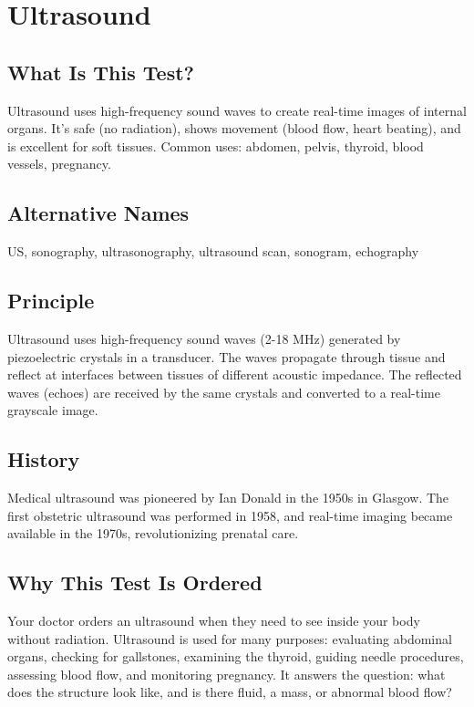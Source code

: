 \chapter{Ultrasound}

\section*{What Is This Test?}
Ultrasound uses high-frequency sound waves to create real-time images of internal organs. It's safe (no radiation), shows movement (blood flow, heart beating), and is excellent for soft tissues. Common uses: abdomen, pelvis, thyroid, blood vessels, pregnancy.

\section*{Alternative Names}
US, sonography, ultrasonography, ultrasound scan, sonogram, echography


\section*{Principle}
Ultrasound uses high-frequency sound waves (2-18 MHz) generated by piezoelectric crystals in a transducer. The waves propagate through tissue and reflect at interfaces between tissues of different acoustic impedance. The reflected waves (echoes) are received by the same crystals and converted to a real-time grayscale image.

\section*{History}
Medical ultrasound was pioneered by Ian Donald in the 1950s in Glasgow. The first obstetric ultrasound was performed in 1958, and real-time imaging became available in the 1970s, revolutionizing prenatal care.

\section*{Why This Test Is Ordered}
Your doctor orders an ultrasound when they need to see inside your body without radiation. Ultrasound is used for many purposes: evaluating abdominal organs, checking for gallstones, examining the thyroid, guiding needle procedures, assessing blood flow, and monitoring pregnancy. It answers the question: what does the structure look like, and is there fluid, a mass, or abnormal blood flow?

